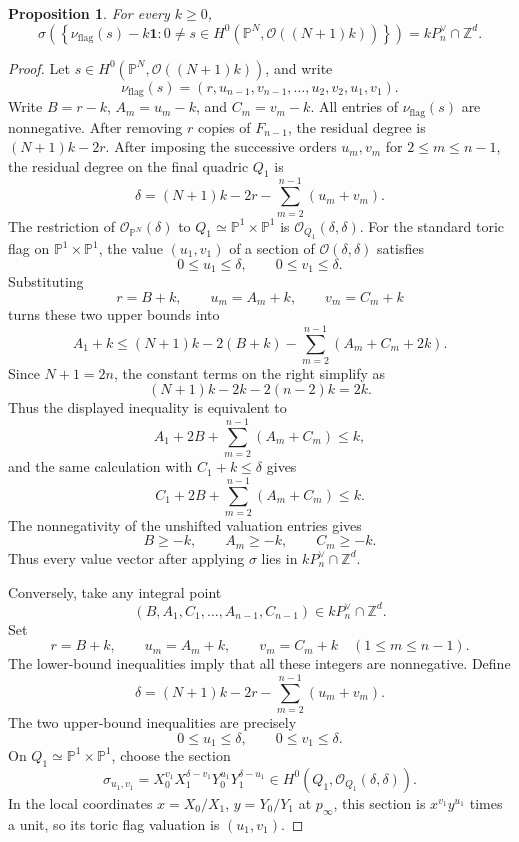 \documentclass{article}
\newtheorem{prop}[thm]{Proposition}
\newcommand{\ZZ}{\mathbb{Z}}
\newcommand{\PP}{\mathbb{P}}
\begin{document}
\begin{prop}\label{prop:no-body-p2n}
For every \(k\ge0\),
\[
\sigma\left(
\left\{
\nu_{\mathrm{flag}}(s)-k\mathbf 1:
0\ne s\in H^0(\PP^N,\mathcal O((N+1)k))
\right\}
\right)
=
kP_n^\vee\cap\ZZ^d.
\]
\end{prop}

\begin{proof}
Let \(s\in H^0(\PP^N,\mathcal O((N+1)k))\), and write
\[
\nu_{\mathrm{flag}}(s)=(r,u_{n-1},v_{n-1},\ldots,u_2,v_2,u_1,v_1).
\]
Write \(B=r-k\), \(A_m=u_m-k\), and \(C_m=v_m-k\).
All entries of \(\nu_{\mathrm{flag}}(s)\) are nonnegative. After removing \(r\) copies of \(F_{n-1}\), the residual degree is \((N+1)k-2r\). After imposing the successive orders \(u_m,v_m\) for \(2\le m\le n-1\), the residual degree on the final quadric \(Q_1\) is
\[
\delta=(N+1)k-2r-
\sum_{m=2}^{n-1}(u_m+v_m).
\]
The restriction of \(\mathcal O_{\PP^N}(\delta)\) to \(Q_1\simeq\PP^1\times\PP^1\) is \(\mathcal O_{Q_1}(\delta,\delta)\). For the standard toric flag on \(\PP^1\times\PP^1\), the value \((u_1,v_1)\) of a section of \(\mathcal O(\delta,\delta)\) satisfies
\[
0\le u_1\le \delta,
\qquad
0\le v_1\le \delta.
\]
Substituting
\[
r=B+k,
\qquad
u_m=A_m+k,
\qquad
v_m=C_m+k
\]
turns these two upper bounds into
\[
A_1+k
\le
(N+1)k-2(B+k)
-
\sum_{m=2}^{n-1}(A_m+C_m+2k).
\]
Since \(N+1=2n\), the constant terms on the right simplify as
\[
(N+1)k-2k-2(n-2)k=2k.
\]
Thus the displayed inequality is equivalent to
\[
A_1+2B+
\sum_{m=2}^{n-1}(A_m+C_m)\le k,
\]
and the same calculation with \(C_1+k\le \delta\) gives
\[
C_1+2B+
\sum_{m=2}^{n-1}(A_m+C_m)\le k.
\]
The nonnegativity of the unshifted valuation entries gives
\[
B\ge -k,
\qquad
A_m\ge -k,
\qquad
C_m\ge -k.
\]
Thus every value vector after applying \(\sigma\) lies in \(kP_n^\vee\cap\ZZ^d\).

Conversely, take any integral point
\[
(B,A_1,C_1,\ldots,A_{n-1},C_{n-1})\in kP_n^\vee\cap\ZZ^d.
\]
Set
\[
r=B+k,
\qquad
u_m=A_m+k,
\qquad
v_m=C_m+k
\quad(1\le m\le n-1).
\]
The lower-bound inequalities imply that all these integers are nonnegative. Define
\[
\delta=(N+1)k-2r-
\sum_{m=2}^{n-1}(u_m+v_m).
\]
The two upper-bound inequalities are precisely
\[
0\le u_1\le \delta,
\qquad
0\le v_1\le \delta.
\]
On \(Q_1\simeq\PP^1\times\PP^1\), choose the section
\[
\sigma_{u_1,v_1}
=
X_0^{v_1}X_1^{\delta-v_1}Y_0^{u_1}Y_1^{\delta-u_1}
\in H^0(Q_1,\mathcal O_{Q_1}(\delta,\delta)).
\]
In the local coordinates \(x=X_0/X_1\), \(y=Y_0/Y_1\) at \(p_\infty\), this section is \(x^{v_1}y^{u_1}\) times a unit, so its toric flag valuation is \((u_1,v_1)\).


\end{proof}
\end{document}

